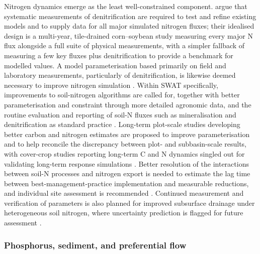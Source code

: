 \documentclass[11pt]{article}
\begin{document}
Nitrogen dynamics emerge as the least well-constrained component. \textcite{David2009} argue that systematic measurements of denitrification are required to test and refine existing models and to supply data for all major simulated nitrogen fluxes; their idealised design is a multi-year, tile-drained corn--soybean study measuring every major N flux alongside a full suite of physical measurements, with a simpler fallback of measuring a few key fluxes plus denitrification to provide a benchmark for modelled values. A model parameterisation based primarily on field and laboratory measurements, particularly of denitrification, is likewise deemed necessary to improve nitrogen simulation \parencite{Salazar2009}. Within SWAT specifically, improvements to soil-nitrogen algorithms are called for, together with better parameterisation and constraint through more detailed agronomic data, and the routine evaluation and reporting of soil-N fluxes such as mineralisation and denitrification as standard practice \parencite{Ikenberry2017}. Long-term plot-scale studies developing better carbon and nitrogen estimates are proposed to improve parameterisation and to help reconcile the discrepancy between plot- and subbasin-scale results, with cover-crop studies reporting long-term C and N dynamics singled out for validating long-term response simulations \parencite{Singer2011}. Better resolution of the interactions between soil-N processes and nitrogen export is needed to estimate the lag time between best-management-practice implementation and measurable reductions, and individual site assessment is recommended \parencite{Law2022}. Continued measurement and verification of parameters is also planned for improved subsurface drainage under heterogeneous soil nitrogen, where uncertainty prediction is flagged for future assessment \parencite{Tao2021}.

\subsubsection{Phosphorus, sediment, and preferential flow}
\end{document}
